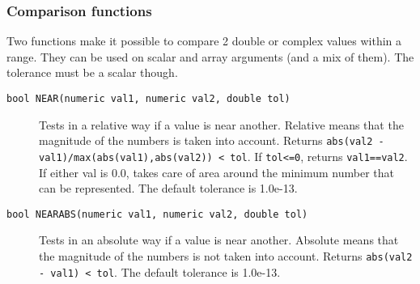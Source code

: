 \subsubsection{Comparison functions}
Two functions make it possible to compare 2 double or complex
values within a range.
They can be used on scalar and array arguments (and a mix of them).
The tolerance must be a scalar though.
\begin{description}
  \item[ \texttt{bool NEAR(numeric val1, numeric val2, double tol)}]
    Tests in a relative way if a value is near another. Relative
    means that the
    magnitude of the numbers is taken into account.
    Returns \texttt{abs(val2 - val1)/max(abs(val1),abs(val2)) < tol}.
    If \texttt{tol<=0}, returns \texttt{val1==val2}.
    If either val is 0.0, takes
    care of area around the minimum number that can be represented.
    The default tolerance is 1.0e-13.
  \item[ \texttt{bool NEARABS(numeric val1, numeric val2, double tol)}]
    Tests in an absolute way if a value is near another. Absolute
    means that the
    magnitude of the numbers is not taken into account.
    Returns \texttt{abs(val2 - val1) < tol}.
    The default tolerance is 1.0e-13.
\end{description}

